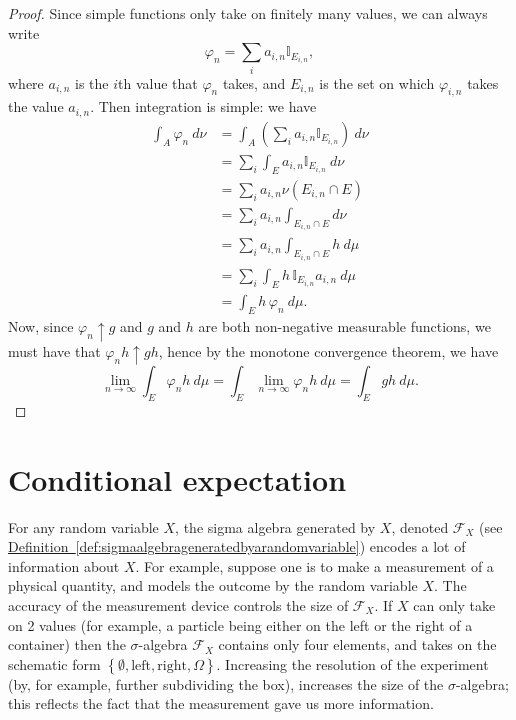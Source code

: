 \documentclass[a4paper]{scrartcl}
\theoremstyle{definition}
\theoremstyle{plain}
\theoremstyle{remark}
\begin{document}
\begin{proof}
  Since simple functions only take on finitely many values, we can always write
  \begin{equation*}
    \varphi_{n} = \sum_{i} a_{i, n} \mathbb{I}_{E_{i, n}},
  \end{equation*}
  where $a_{i, n}$ is the $i$th value that $\varphi_{n}$ takes, and $E_{i, n}$ is the set on which $\varphi_{i, n}$ takes the value $a_{i, n}$. Then integration is simple: we have
  \begin{align*}
    \int_{A} \varphi_{n}\ d\nu &= \int_{A} \left( \sum_{i} a_{i, n} \mathbb{I}_{E_{i, n}} \right)\ d\nu \\
    &= \sum_{i} \int_{E} a_{i, n} \mathbb{I}_{E_{i, n}}\ d\nu \\
    &= \sum_{i} a_{i, n} \nu(E_{i, n} \cap E) \\
    &= \sum_{i} a_{i, n} \int_{E_{i, n} \cap E} d \nu \\
    &= \sum_{i} a_{i, n} \int_{E_{i, n} \cap E} h\ d\mu \\
    &= \sum_{i} \int_{E} h\,\mathbb{I}_{E_{i, n}} a_{i, n} \ d\mu \\
    &= \int_{E} h\,\varphi_{n}\ d\mu.
  \end{align*}
  Now, since $\varphi_{n} \uparrow g$ and $g$ and $h$ are both non-negative measurable functions, we must have that $\varphi_{n} h \uparrow gh$, hence by the monotone convergence theorem, we have
  \begin{equation*}
    \lim_{n \to \infty} \int_{E} \varphi_{n} h\ d\mu = \int_{E} \lim_{n \to \infty} \varphi_{n} h\ d\mu = \int_{E} gh\ d\mu.
  \end{equation*}
\end{proof}

\section{Conditional expectation}
For any random variable $X$, the sigma algebra generated by $X$, denoted $\mathcal{F}_{X}$ (see \hyperref[def:sigmaalgebrageneratedbyarandomvariable]{Definition~\ref*{def:sigmaalgebrageneratedbyarandomvariable}}) encodes a lot of information about $X$. For example, suppose one is to make a measurement of a physical quantity, and models the outcome by the random variable $X$. The accuracy of the measurement device controls the size of $\mathcal{F}_{X}$. If $X$ can only take on 2 values (for example, a particle being either on the left or the right of a container) then the $\sigma$-algebra $\mathcal{F}_{X}$ contains only four elements, and takes on the schematic form $\left\{ \emptyset, \text{left}, \text{right}, \Omega \right\}$. Increasing the resolution of the experiment (by, for example, further subdividing the box), increases the size of the $\sigma$-algebra; this reflects the fact that the measurement gave us more information.
\end{document}
